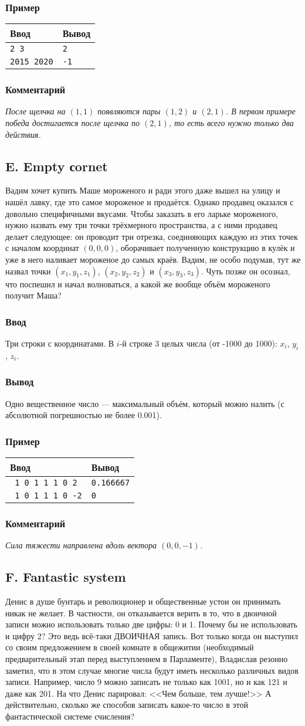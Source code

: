 \documentclass[10pt, a4paper]{article}
\newcommand{\informat}[1]
{
	\subsubsection*{Ввод} #1
}
\newcommand{\outformat}[1]
{
	\subsubsection*{Вывод} #1
}
\newcommand{\examplee}[4]
{
	\subsubsection*{Пример}
	\noindent
	\begin{center}
	\begin{tabularx}{\linewidth}{|X|X|}
	\hline
	Ввод 	& Вывод  	\\
	\hline
	{\tt #1} & {\tt #2}	\\
	\hline
	{\tt #3} & {\tt #4}	\\
	\hline
	\end{tabularx}
	\end{center}
}
\newcommand{\excomm}[1]
{
	\subsubsection*{Комментарий}
	\textit{#1}
}
\begin{document}
\examplee{2 3}{2}{2015 2020}{-1}

\excomm{После щелчка на $(1, 1)$ появляются пары $(1, 2)$ и $(2, 1)$. В первом примере победа достигается после щелчка по $(2, 1)$, то есть всего нужно только два действия.}



\subsection*{E. Empty сornet}

Вадим хочет купить Маше мороженого и ради этого даже вышел на улицу и нашёл лавку, где это самое мороженое и продаётся. Однако продавец оказался с довольно специфичными вкусами. Чтобы заказать в его ларьке мороженого, нужно назвать ему три точки трёхмерного пространства, а с ними продавец делает следующее: он проводит три отрезка, соединяющих каждую из этих точек с началом координат $(0, 0, 0)$, оборачивает полученную конструкцию в кулёк и уже в него наливает мороженое до самых краёв. Вадим, не особо подумав, тут же назвал точки $(x_1, y_1, z_1)$, $(x_2, y_2, z_2)$ и $(x_3, y_3, z_3)$. Чуть позже он осознал, что поспешил и начал волноваться, а какой же вообще объём мороженого получит Маша?

\informat{Три строки с координатами. В $i$-й строке 3 целых числа (от -1000 до 1000): $x_i$, $y_i$, $z_i$.}

\outformat{Одно вещественное число --- максимальный объём, который можно налить (с абсолютной погрешностью не более 0.001).}

\examplee{%
1 0 1 \newline
0 1 1 \newline
0 0 2}%
{0.166667}{%
1 0 1 \newline
0 1 1 \newline
0 0 -2}%
{0}

\excomm{Сила тяжести направлена вдоль вектора $(0, 0, -1)$.}



\subsection*{F. Fantastic system}

Денис в душе бунтарь и революционер и общественные устои он принимать никак не желает. В частности, он отказывается верить в то, что в двоичной записи можно использовать только две цифры: 0 и 1. Почему бы не использовать и цифру 2? Это ведь всё-таки ДВОИЧНАЯ запись. Вот только когда он выступил со своим предложением в своей комнате в общежитии (необходимый предварительный этап перед выступлением в Парламенте), Владислав резонно заметил, что в этом случае многие числа будут иметь несколько различных видов записи. Например, число 9 можно записать не только как 1001, но и как 121 и даже как 201. На что Денис парировал: <<Чем больше, тем лучше!>> А действительно, сколько же способов записать какое-то число в этой фантастической системе счисления?
\end{document}
